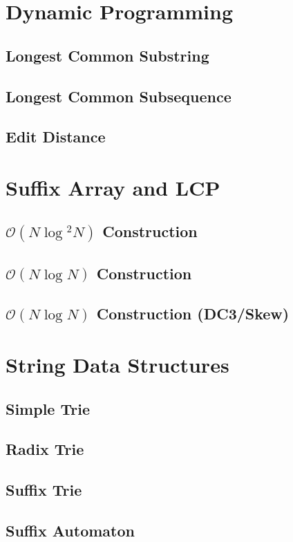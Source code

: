 \section{Dynamic Programming}
\setcounter{section}{4}
\setcounter{subsection}{0}
\subsection{Longest Common Substring}

\subsection{Longest Common Subsequence}

\subsection{Edit Distance}


\section{Suffix Array and LCP}
\setcounter{section}{5}
\setcounter{subsection}{0}
\subsection{$\mathcal{O}(N\log{}^2N)$ Construction}

\subsection{$\mathcal{O}(N\log{}N)$ Construction}

\subsection{$\mathcal{O}(N\log{}N)$ Construction (DC3/Skew)}


\section{String Data Structures}
\setcounter{section}{5}
\setcounter{subsection}{0}
\subsection{Simple Trie}

\subsection{Radix Trie}

\subsection{Suffix Trie}

\subsection{Suffix Automaton}

